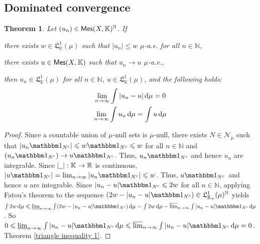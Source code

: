 \documentclass[11pt, a4paper, openany]{book}
\newtheorem{thm}{Theorem}\newtheorem{lem}{Lemma}\newtheorem{crl}{Corollary}
\theoremstyle{definition}
\newcommand{\sph}{\underline{\hspace{0.2cm}}}
\newcommand{\cat}[1]{\textup{\textsf{#1}}}
\newcommand{\er}{\overline{\mathbb{R}}}
\newenvironment{tight_enumerate}{\begin{enumerate}\itemsep -0.2em}{\end{enumerate}}
\begin{document}
\subsection{Dominated convergence}
    \begin{thm}\label{dominated convergence theorem}
        Let $(u_n)\in\cat{Mes}(X,\mathbb{K})^\mathbb{N}$. If
        \begin{tight_enumerate}
            \item there exists $w\in\mathfrak{L}_\mathbb{R}^1(\mu)$ such that $|u_n|\leqslant w\,\,\mu$-a.e. for all $n\in\mathbb{N}$,
            \item there exists $u\in\cat{Mes}(X,\mathbb{K})$ such that $u_n\to u$ $\mu$-a.e.,
        \end{tight_enumerate}
        then $u_n\in\mathfrak{L}^1_\mathbb{K}(\mu)$ for all $n\in\mathbb{N}$, $u\in\mathfrak{L}^1_\mathbb{K}(\mu)$, and the following holds:
        \begin{gather*}
            \lim_{n\to\infty}\int |u_n-u|\odif\mu=0 \\
            \lim_{n\to\infty}\int u_n\odif\mu=\int u\odif\mu
        \end{gather*}
    \end{thm}
    \begin{proof}
        Since a countable union of $\mu$-null sets is $\mu$-null, there exists $N\in\mathscr{N}_\mu$ such that $|u_n\one_{N^c}|\leqslant w \one_{N^c}\leqslant w$ for all $n\in\mathbb{N}$ and $(u_n\one_{N^c})\to u\one_{N^c}$. Thus, $u_n\one_{N^c}$ and hence $u_n$ are integrable. Since $|\sph|:\mathbb{K}\rightarrow\mathbb{R}$ is continuous, $|u\one_{N^c}|=\lim_{n\to\infty}|u_n\one_{N^c}|\leqslant w$. Thus, $u\one_{N^c}$ and hence $u$ are integrable. Since $|u_n-u|\one_{N^c}\leqslant 2w$ for all $n\in\mathbb{N}$, applying Fatou's theorem to the sequence $(2w-|u_n-u|\one_{N^c})\in\mathfrak{L}^1_{\mathbb{R}_+}(\mu)^\mathbb{N}$ yields $\int 2w\odif \mu\leqslant \varliminf_{n\to\infty} \int (2w-|u_n-u|\one_{N^c})\odif \mu=\int 2w\odif \mu- \varlimsup_{n\to\infty} \int |u_n-u|\one_{N^c}\odif \mu$. So $0\leqslant \varliminf_{n\to\infty} \int |u_n-u|\one_{N^c}\odif \mu\leqslant \varlimsup_{n\to\infty} \int |u_n-u|\one_{N^c}\odif \mu=0$. Theorem \ref{triangle inequality 1}.
    \end{proof}
\end{document}
